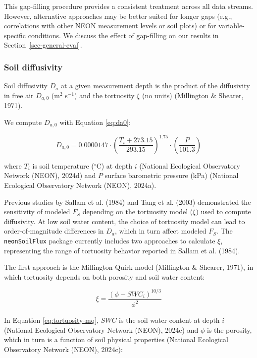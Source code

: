 \documentclass[
  letterpaper,
  DIV=11,
  numbers=noendperiod]{scrartcl}
\begin{document}
This gap-filling procedure provides a consistent treatment across all
data streams. However, alternative approaches may be better suited for
longer gaps (e.g., correlations with other NEON measurement levels or
soil plots) or for variable-specific conditions. We discuss the effect
of gap-filling on our results in Section~\ref{sec-general-eval}.

\subsubsection{Soil diffusivity}\label{sec-compute-diffusivity}

Soil diffusivity \(D_{a}\) at a given measurement depth is the product
of the diffusivity in free air \(D_{a,0}\) (m\(^{2}\) s\(^{-1}\)) and
the tortuosity \(\xi\) (no units) (Millington \& Shearer, 1971).

We compute \(D_{a,0}\) with Equation \ref{eq:da0}:

\begin{equation}
  D_{a,0} = 0.0000147 \cdot \left( \frac{T_{i} + 273.15}{293.15} \right)^{1.75} \cdot \left( \frac{P}{101.3} \right)
  \label{eq:da0}
\end{equation}

where \(T_{i}\) is soil temperature (\(^\circ\)C) at depth \(i\)
(National Ecological Observatory Network (NEON), 2024d) and \(P\)
surface barometric pressure (kPa) (National Ecological Observatory
Network (NEON), 2024a).

Previous studies by Sallam et al. (1984) and Tang et al. (2003)
demonstrated the sensitivity of modeled \(F_{S}\) depending on the
tortuosity model (\(\xi\)) used to compute diffusivity. At low soil
water content, the choice of tortuosity model can lead to
order-of-magnitude differences in \(D_{a}\), which in turn affect
modeled \(F_{S}\). The \texttt{neonSoilFlux} package currently includes
two approaches to calculate \(\xi\), representing the range of
tortuosity behavior reported in Sallam et al. (1984).

The first approach is the Millington-Quirk model (Millington \& Shearer,
1971), in which tortuosity depends on both porosity and soil water
content:

\begin{equation}
  \xi = \frac{(\phi - SWC_{i})^{10/3}}{\phi^{2}}
  \label{eq:tortuosity-mq}
\end{equation}

In Equation \ref{eq:tortuosity-mq}, \(SWC\) is the soil water content at
depth \(i\) (National Ecological Observatory Network (NEON), 2024e) and
\(\phi\) is the porosity, which in turn is a function of soil physical
properties (National Ecological Observatory Network (NEON), 2024c):
\end{document}
